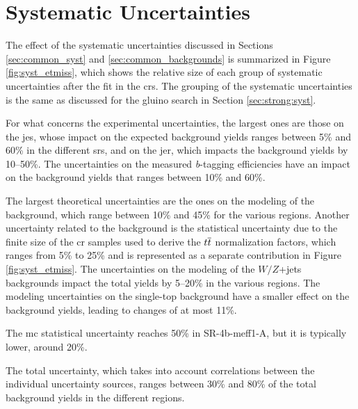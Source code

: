 \section{Systematic Uncertainties}
\label{sec:ewk:syst}

The effect of the systematic uncertainties discussed in Sections \ref{sec:common_syst} and \ref{sec:common_backgrounds} 
is summarized in Figure \ref{fig:syst_etmiss}, which shows the relative size of each group of systematic uncertainties after the fit in the 
\glspl{cr}. 
The grouping of the systematic uncertainties is the same as discussed for the gluino search in Section \ref{sec:strong:syst}. 

For what concerns the experimental uncertainties, the largest ones are those on the \gls{jes}, 
whose impact on the expected background yields ranges between 5\% and 60\% in the different \glspl{sr}, 
and on the \gls{jer}, which impacts the background yields by 10--50\%. 
The uncertainties on the measured \textit{b}-tagging efficiencies have an impact on the background yields 
that ranges between 10\% and 60\%. 

The largest theoretical uncertainties are the ones on the modeling of the \ttbar background, which range between 10\% and 45\% for the various regions. 
Another uncertainty related to the \ttbar background is the statistical uncertainty due to the finite size of the \gls{cr} samples used to derive  the $t\overline{t}$ normalization factors, which ranges from 5\% to 25\% and is represented as a separate contribution in Figure \ref{fig:syst_etmiss}.  
The uncertainties on the modeling of the $W/Z$+jets backgrounds  
impact the total yields by 5--20\% in the various regions. 
The modeling uncertainties on the single-top background have a smaller effect on the background yields, leading to changes of at most 11\%. 

The \gls{mc} statistical uncertainty reaches 50\% in SR-4b-meff1-A, but it is typically lower, around 20\%. 
 
The total uncertainty, which takes into account correlations between the individual uncertainty sources, ranges between 30\% and 80\% 
of the total background yields in the different regions. 
 

